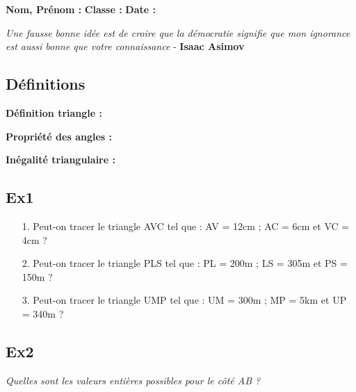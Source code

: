 



\textbf{Nom, Prénom :} \hspace{8cm} \textbf{Classe :} \hspace{3cm} \textbf{Date :}\\
\vspace{-0.8cm}
\begin{center}
  \textit{Une fausse bonne idée est de croire que la démocratie signifie que mon ignorance est aussi bonne que votre connaissance}  - \textbf{Isaac Asimov}
\end{center}
\vspace{-0.8cm}

\subsection*{Définitions}

\textbf{Définition triangle :} \dotfill \\
\Pointilles[1]

\textbf{Propriété des angles :} \dotfill \\
\Pointilles[2]

\textbf{Inégalité triangulaire :} \dotfill \\
\Pointilles[2]


\subsection*{Ex1}

\begin{enumerate}
  \item[1.] Peut-on tracer le triangle AVC tel que : AV = 12cm ; AC = 6cm et VC = 4cm ? \\ \Pointilles[2] 
  \item[2.] Peut-on tracer le triangle PLS tel que : PL = 200m ; LS = 305m et PS = 150m ? \\ \Pointilles[2] 
  \item[3.] Peut-on tracer le triangle UMP tel que : UM = 300m ; MP = 5km et UP = 340m ? \\ \Pointilles[2] 
\end{enumerate} 


\subsection*{Ex2}
\textit{Quelles sont les valeurs entières possibles pour le côté AB ?}

